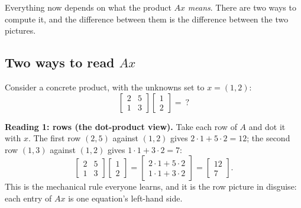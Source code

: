 Everything now depends on what the product $Ax$ \emph{means}. There are two ways to compute it, and the difference between them is the difference between the two pictures.

\subsection{Two ways to read \texorpdfstring{$Ax$}{Ax}}

Consider a concrete product, with the unknowns set to $x=(1,2)$:
\[
\begin{bmatrix} 2 & 5\\ 1 & 3\end{bmatrix}
\begin{bmatrix} 1\\ 2\end{bmatrix}=\ ?
\]

\textbf{Reading 1: rows (the dot-product view).} Take each row of $A$ and dot it with $x$. The first row $(2,5)$ against $(1,2)$ gives $2\cdot1+5\cdot2=12$; the second row $(1,3)$ against $(1,2)$ gives $1\cdot1+3\cdot2=7$:
\[
\begin{bmatrix} 2 & 5\\ 1 & 3\end{bmatrix}
\begin{bmatrix} 1\\ 2\end{bmatrix}
=\begin{bmatrix} 2\cdot1+5\cdot2\\ 1\cdot1+3\cdot2\end{bmatrix}
=\begin{bmatrix} 12\\ 7\end{bmatrix}.
\]
This is the mechanical rule everyone learns, and it is the row picture in disguise: each entry of $Ax$ is one equation's left-hand side.

